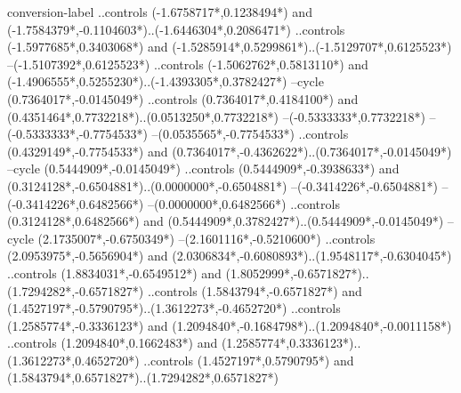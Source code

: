 {\begin{scope}[x=1mm,y=1mm,line width=\SCstroke mm,line cap=round,line join=round]
\begin{SCpart}{conversion-label}
      ..controls ({-1.6758717*\SCscale},{0.1238494*\SCscale}) and ({-1.7584379*\SCscale},{-0.1104603*\SCscale})..({-1.6446304*\SCscale},{0.2086471*\SCscale})
      ..controls ({-1.5977685*\SCscale},{0.3403068*\SCscale}) and ({-1.5285914*\SCscale},{0.5299861*\SCscale})..({-1.5129707*\SCscale},{0.6125523*\SCscale})
      --({-1.5107392*\SCscale},{0.6125523*\SCscale})
      ..controls ({-1.5062762*\SCscale},{0.5813110*\SCscale}) and ({-1.4906555*\SCscale},{0.5255230*\SCscale})..({-1.4393305*\SCscale},{0.3782427*\SCscale})
      --cycle
      ({0.7364017*\SCscale},{-0.0145049*\SCscale})
      ..controls ({0.7364017*\SCscale},{0.4184100*\SCscale}) and ({0.4351464*\SCscale},{0.7732218*\SCscale})..({0.0513250*\SCscale},{0.7732218*\SCscale})
      --({-0.5333333*\SCscale},{0.7732218*\SCscale})
      --({-0.5333333*\SCscale},{-0.7754533*\SCscale})
      --({0.0535565*\SCscale},{-0.7754533*\SCscale})
      ..controls ({0.4329149*\SCscale},{-0.7754533*\SCscale}) and ({0.7364017*\SCscale},{-0.4362622*\SCscale})..({0.7364017*\SCscale},{-0.0145049*\SCscale})
      --cycle
      ({0.5444909*\SCscale},{-0.0145049*\SCscale})
      ..controls ({0.5444909*\SCscale},{-0.3938633*\SCscale}) and ({0.3124128*\SCscale},{-0.6504881*\SCscale})..({0.0000000*\SCscale},{-0.6504881*\SCscale})
      --({-0.3414226*\SCscale},{-0.6504881*\SCscale})
      --({-0.3414226*\SCscale},{0.6482566*\SCscale})
      --({0.0000000*\SCscale},{0.6482566*\SCscale})
      ..controls ({0.3124128*\SCscale},{0.6482566*\SCscale}) and ({0.5444909*\SCscale},{0.3782427*\SCscale})..({0.5444909*\SCscale},{-0.0145049*\SCscale})
      --cycle
      ({2.1735007*\SCscale},{-0.6750349*\SCscale})
      --({2.1601116*\SCscale},{-0.5210600*\SCscale})
      ..controls ({2.0953975*\SCscale},{-0.5656904*\SCscale}) and ({2.0306834*\SCscale},{-0.6080893*\SCscale})..({1.9548117*\SCscale},{-0.6304045*\SCscale})
      ..controls ({1.8834031*\SCscale},{-0.6549512*\SCscale}) and ({1.8052999*\SCscale},{-0.6571827*\SCscale})..({1.7294282*\SCscale},{-0.6571827*\SCscale})
      ..controls ({1.5843794*\SCscale},{-0.6571827*\SCscale}) and ({1.4527197*\SCscale},{-0.5790795*\SCscale})..({1.3612273*\SCscale},{-0.4652720*\SCscale})
      ..controls ({1.2585774*\SCscale},{-0.3336123*\SCscale}) and ({1.2094840*\SCscale},{-0.1684798*\SCscale})..({1.2094840*\SCscale},{-0.0011158*\SCscale})
      ..controls ({1.2094840*\SCscale},{0.1662483*\SCscale}) and ({1.2585774*\SCscale},{0.3336123*\SCscale})..({1.3612273*\SCscale},{0.4652720*\SCscale})
      ..controls ({1.4527197*\SCscale},{0.5790795*\SCscale}) and ({1.5843794*\SCscale},{0.6571827*\SCscale})..({1.7294282*\SCscale},{0.6571827*\SCscale})

\end{SCpart}
\end{scope}}
